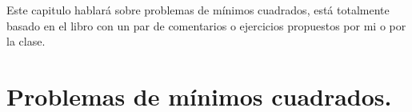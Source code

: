 Este capitulo hablará sobre problemas de mínimos cuadrados, está totalmente basado en el libro \cite{MR2597943} con un par de comentarios o ejercicios propuestos por mi o por la clase. 
\newpage
\section{Problemas de mínimos cuadrados.}
  
